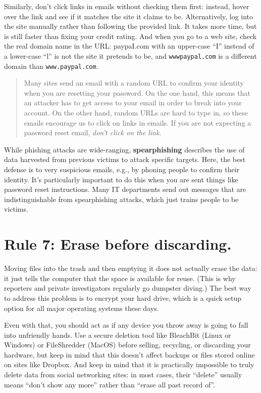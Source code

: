 \documentclass[10pt,letterpaper]{article}
\begin{document}
Similarly, don't click links in emails without checking them first: instead,
hover over the link and see if it matches the site it claims to be.
Alternatively, log into the site manually rather than following the provided
link. It takes more time, but is still faster than fixing your credit rating.
And when you go to a web site, check the real domain name in the URL: paypaI.com
with an upper-case ``I'' instead of a lower-case ``l'' is not the site it
pretends to be, and \texttt{wwwpaypal.com} is a different domain than
\texttt{www.paypal.com}.

\begin{quote}
  Many sites send an email with a random URL to confirm your identity when you
  are resetting your password. On the one hand, this means that an attacker has
  to get access to your email in order to break into your account. On the other
  hand, random URLs are hard to type in, so these emails encourage us to click
  on links in emails. If you are not expecting a password reset
  email, \emph{don't click on the link}.
\end{quote}

While phishing attacks are wide-ranging, \textbf{spearphishing} describes the
use of data harvested from previous victims to attack specific targets. Here,
the best defense is to very suspicious emails, e.g., by phoning people to
confirm their identity. It's particularly important to do this when you are sent
things like password reset instructions. Many IT departments send out messages
that are indistinguishable from spearphishing attacks, which just trains people
to be victims.

\section*{Rule 7: Erase before discarding.}

Moving files into the trash and then emptying it does not actually erase the
data: it just tells the computer that the space is available for reuse. (This is
why reporters and private investigators regularly go dumpster diving.) The best
way to address this problem is to encrypt your hard drive, which is a quick
setup option for all major operating systems these days.

Even with that, you should act as if any device you throw away is going to fall
into unfriendly hands. Use a secure deletion tool like BleachBit (Linux or
Windows) or FileShredder (MacOS) before selling, recycling, or discarding your
hardware, but keep in mind that this doesn't affect backups or files stored
online on sites like Dropbox. And keep in mind that it is practically impossible
to truly delete data from social networking sites: in most cases, their
``delete'' usually means ``don't show any more'' rather than ``erase all past
record of''.
\end{document}
